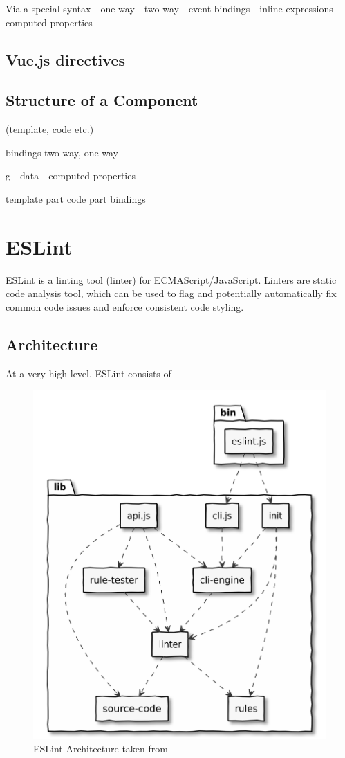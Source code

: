Via a special syntax
- one way
- two way
- event bindings
- inline expressions
- computed properties

\subsection{Vue.js directives}
\subsection{Structure of a Component}

(template, code etc.)

bindings two way, one way

g
- data
- computed properties

template part
code part
bindings


\section{ESLint}

ESLint \parencite{eslintMainPage} is a linting tool (linter) for ECMAScript/JavaScript. Linters are static code analysis tool, which can be used to flag and potentially automatically fix common code issues and enforce consistent code styling.


\subsection{Architecture}

At a very high level, ESLint consists of 
\begin{figure}[H]
    \includegraphics[width=\textwidth]{images/eslint_architecture.png}
     \caption{ESLint Architecture taken from \cite{eslintArchitecture}}
     \label{fig:eslintArchitecture}
   \end{figure}


